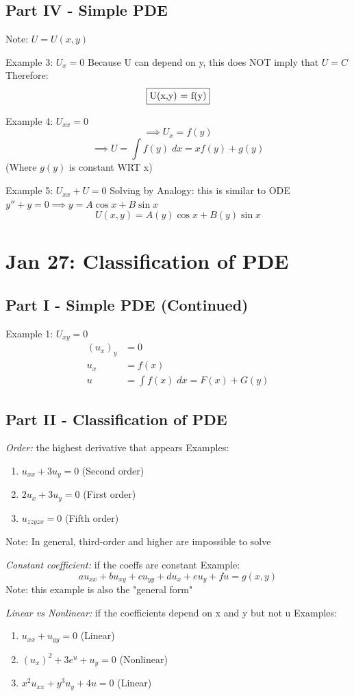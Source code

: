 \documentclass[12pt]{article}
\begin{document}
\subsection*{Part IV - Simple PDE}
Note: $U = U(x, y)$

Example 3: $U_x = 0$
Because U can depend on y, this does NOT imply that $U = C$
Therefore:
\[\boxed{$U(x,y) = f(y)$}\]

Example 4: $U_{xx} = 0$
\[\implies U_x = f(y) \]
\[\implies U = \int f(y)\; dx = \boxed{xf(y) + g(y)}\]
(Where $g(y)$ is constant WRT x)\

Example 5: $U_{xx} + U = 0$
Solving by Analogy: this is similar to ODE $y'' + y = 0 \implies y = A\cos x + B \sin x$
\[\boxed{U(x, y) = A(y)\cos x + B(y)\sin x}\]

\section{Jan 27: Classification of PDE}
\subsection*{Part I - Simple PDE (Continued)}
Example 1: $U_{xy} = 0$
\begin{align*}
    (u_x)_y &= 0\\
    u_x &= f(x)\\
    u &= \int f(x) \; dx = \boxed{F(x) + G(y)}
\end{align*}

\subsection*{Part II - Classification of PDE}
\emph{Order:} the highest derivative that appears
Examples:
\begin{enumerate}
    \item $u_{xx} + 3u_y = 0$ \quad (Second order)
    \item $2u_x + 3u_y = 0$ \quad (First order)
    \item $u_{zzyzx} = 0$ \quad (Fifth order)
\end{enumerate}
Note: In general, third-order and higher are impossible to solve 

\emph{Constant coefficient:} if the coeffs are constant
Example:
\[au_{xx} + bu_{xy} + cu_{yy} + du_x + eu_y + fu = g(x, y)\]
Note: this example is also the "general form"

\emph{Linear vs Nonlinear:} if the coefficients depend on x and y but not u 
Examples:
\begin{enumerate}
    \item $u_{xx} + u_{yy} = 0$ \quad (Linear)
    \item $(u_x)^2 + 3e^u + u_y = 0$ \quad (Nonlinear)
    \item $x^2u_{xx} + y^3u_y + 4u = 0$ \quad (Linear)
\end{enumerate}
\end{document}
